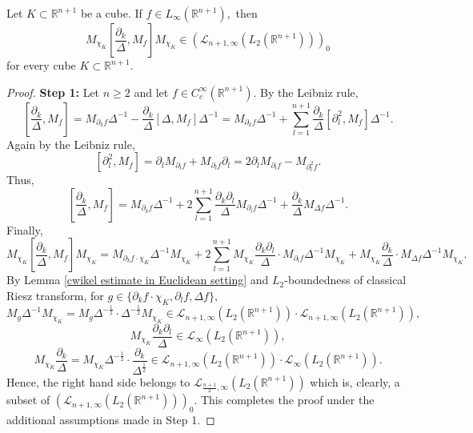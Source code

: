 \documentclass{amsart}
\begin{document}
\begin{lemma}\label{mtb separable part lemma} Let $K\subset\mathbb{R}^{n+1}$ be a cube. If $f\in L_{\infty}(\mathbb{R}^{n+1}),$ then
$$M_{\chi_K}[\frac{\partial_k}{\Delta},M_f]M_{\chi_K}\in (\mathcal{L}_{n+1,\infty}(L_2(\mathbb{R}^{n+1})))_0$$
for every cube $K\subset\mathbb{R}^{n+1}.$
\end{lemma}
\begin{proof} {\bf Step 1:} Let $n\geq 2$ and let $f\in C^{\infty}_c(\mathbb{R}^{n+1}).$ By the Leibniz rule,
$$[\frac{\partial_k}{\Delta},M_f]=M_{\partial_kf}\Delta^{-1}-\frac{\partial_k}{\Delta}[\Delta,M_f]\Delta^{-1}=M_{\partial_kf}\Delta^{-1}+\sum_{l=1}^{n+1}\frac{\partial_k}{\Delta}[\partial_l^2,M_f]\Delta^{-1}.$$
Again by the Leibniz rule,
$$[\partial_l^2,M_f]=\partial_lM_{\partial_lf}+M_{\partial_lf}\partial_l=2\partial_lM_{\partial_lf}-M_{\partial_l^2f}.$$
Thus,
$$[\frac{\partial_k}{\Delta},M_f]=M_{\partial_kf}\Delta^{-1}+2\sum_{l=1}^{n+1}\frac{\partial_k\partial_l}{\Delta}M_{\partial_lf}\Delta^{-1}+\frac{\partial_k}{\Delta}M_{\Delta f}\Delta^{-1}.$$
Finally,
$$M_{\chi_K}[\frac{\partial_k}{\Delta},M_f]M_{\chi_K}=M_{\partial_kf\cdot \chi_K}\Delta^{-1}M_{\chi_K}+2\sum_{l=1}^{n+1}M_{\chi_K}\frac{\partial_k\partial_l}{\Delta}\cdot M_{\partial_lf}\Delta^{-1}M_{\chi_K}+M_{\chi_K}\frac{\partial_k}{\Delta}\cdot M_{\Delta f}\Delta^{-1}M_{\chi_K}.$$
By Lemma \ref{cwikel estimate in Euclidean setting} and $L_2$-boundedness of classical Riesz transform, for $g\in \{\partial_kf\cdot\chi_K,\partial_lf,\Delta f\}$,
$$M_{g}\Delta^{-1}M_{\chi_K}=M_{g}\Delta^{-\frac12}\cdot\Delta^{-\frac12}M_{\chi_K}\in \mathcal{L}_{n+1,\infty}(L_2(\mathbb{R}^{n+1}))\cdot \mathcal{L}_{n+1,\infty}(L_2(\mathbb{R}^{n+1})),$$
$$M_{\chi_K}\frac{\partial_k\partial_l}{\Delta}\in \mathcal{L}_{\infty}(L_2(\mathbb{R}^{n+1})),$$
$$M_{\chi_K}\frac{\partial_k}{\Delta}=M_{\chi_K}\Delta^{-\frac12}\cdot\frac{\partial_k}{\Delta^{\frac12}}\in \mathcal{L}_{n+1,\infty}(L_2(\mathbb{R}^{n+1}))\cdot \mathcal{L}_{\infty}(L_2(\mathbb{R}^{n+1})).$$
Hence, the right hand side belongs to $\mathcal{L}_{\frac{n+1}{2},\infty}(L_2(\mathbb{R}^{n+1}))$ which is, clearly, a subset of $(\mathcal{L}_{n+1,\infty}(L_2(\mathbb{R}^{n+1})))_0.$ This completes the proof under the additional assumptions made in Step 1.
	


\end{proof}
\end{document}
